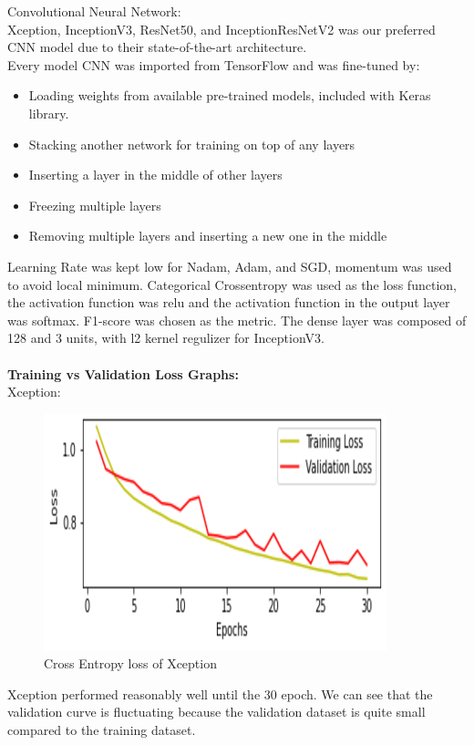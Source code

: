 \documentclass[sigconf]{acmart}
\begin{document}
Convolutional Neural Network:\\
Xception, InceptionV3, ResNet50, and InceptionResNetV2 was our preferred CNN model due to their state-of-the-art architecture. \\
Every model CNN was imported from TensorFlow and was fine-tuned by: \\
\begin{itemize}
  \item Loading weights from available pre-trained models, included with Keras library. 
  \item Stacking another network for training on top of any layers 
  \item Inserting a layer in the middle of other layers
  \item Freezing multiple layers
  \item Removing multiple layers and inserting a new one in the middle
\end{itemize}
Learning Rate was kept low for Nadam, Adam, and SGD, momentum was used to avoid local minimum. Categorical Crossentropy was used as the loss function, the activation function was relu and the activation function in the output layer was softmax. F1-score was chosen as the metric. The dense layer was composed of 128 and 3 units, with l2 kernel regulizer for InceptionV3.
\\
\\
\textbf{Training vs Validation Loss Graphs:}\\

  

Xception:\\
\begin{figure}[h]
  \centering
  
  \includegraphics[width=\linewidth]{../supplements/5.Xception.png}
 
   \caption{Cross Entropy loss of Xception}
  \label{Fig.6}
\end{figure}
Xception performed reasonably well until the 30 epoch. We can see that the validation curve is fluctuating because the validation dataset is quite small compared to the training dataset.\\
\end{document}
